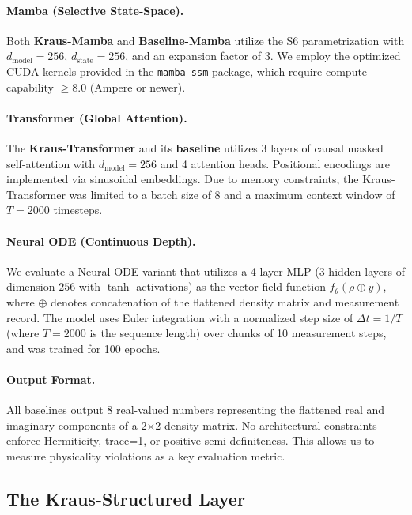 \documentclass{article} %
\begin{document}
\paragraph{Mamba (Selective State-Space).}
Both \textbf{Kraus-Mamba} and \textbf{Baseline-Mamba} utilize the S6 parametrization \citep{gu2024mamba} with $d_{\text{model}}=256$, $d_{\text{state}}=256$, and an expansion factor of $3$. We employ the optimized CUDA kernels provided in the \texttt{mamba-ssm} package, which require compute capability $\geq 8.0$ (Ampere or newer).

\paragraph{Transformer (Global Attention).}
The \textbf{Kraus-Transformer} and its \textbf{baseline} utilizes 3 layers of causal masked self-attention with $d_{\text{model}}=256$ and 4 attention heads. Positional encodings are implemented via sinusoidal embeddings. Due to memory constraints, the Kraus-Transformer was limited to a batch size of 8 and a maximum context window of $T=2000$ timesteps.

\paragraph{Neural ODE (Continuous Depth).}
We evaluate a Neural ODE variant that utilizes a 4-layer MLP (3 hidden layers of dimension $256$ with $\tanh$ activations) as the vector field function $f_\theta(\rho \oplus y)$, where $\oplus$ denotes concatenation of the flattened density matrix and measurement record. The model uses Euler integration with a normalized step size of $\Delta t = 1/T$ (where $T=2000$ is the sequence length) over chunks of 10 measurement steps, and was trained for 100 epochs.

\paragraph{Output Format.}
All baselines output 8 real-valued numbers representing the flattened real and imaginary components of a 2×2 density matrix. No architectural constraints enforce Hermiticity, trace=1, or positive semi-definiteness. This allows us to measure physicality violations as a key evaluation metric.

\subsection{The Kraus-Structured Layer}
\end{document}

